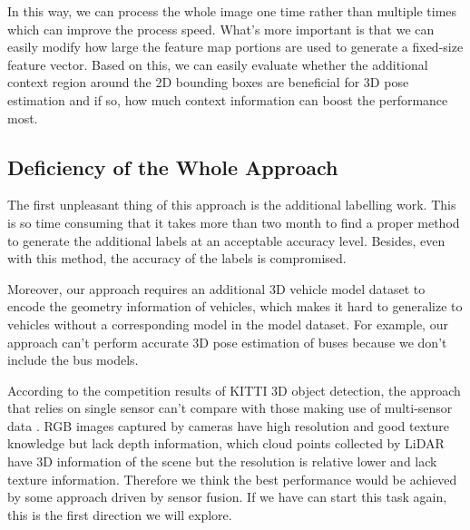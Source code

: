 In this way, we can process the whole image one time rather than multiple times which can improve the process speed. What's more important is that we can easily modify how large the feature map portions are used to generate a fixed-size feature vector. Based on this, we can easily evaluate whether the additional context region around the 2D bounding boxes are beneficial for 3D pose estimation and if so, how much context information can boost the performance most.  


\subsection{Deficiency of the Whole Approach}
The first unpleasant thing of this approach is the additional labelling work. This is so time consuming that it takes more than two month to find a proper method to generate the additional labels at an acceptable accuracy level. Besides, even with this method, the accuracy of the labels is compromised.

Moreover, our approach requires an additional 3D vehicle model dataset to encode the geometry information of vehicles, which makes it hard to generalize to vehicles without a corresponding model in the model dataset. For example, our approach can't perform accurate 3D pose estimation of buses because we don't include the bus models.

According to the competition results of KITTI 3D object detection, the approach that relies on single sensor can't compare with those making use of multi-sensor data \cite{3dobject}. RGB images captured by cameras have high resolution and good texture knowledge but lack depth information, which cloud points collected by LiDAR have 3D information of the scene but the resolution is relative lower and lack texture information. Therefore we think the best performance would be achieved by some approach driven by sensor fusion. If we have can start this task again, this is the first direction we will explore.




